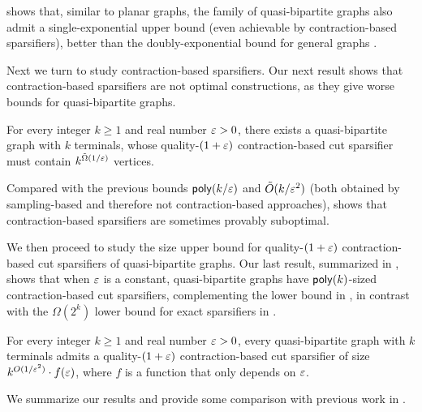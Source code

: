  shows that, similar to planar graphs, the family of quasi-bipartite graphs also admit a single-exponential upper bound (even achievable by contraction-based sparsifiers), better than the doubly-exponential bound for general graphs \cite{hagerup1998characterizing,khan2014mimicking,karpov2017exponential}.

Next we turn to study contraction-based sparsifiers.
Our next result shows that contraction-based sparsifiers are not optimal constructions, as they give worse bounds for quasi-bipartite graphs.

\begin{theorem}
\label{main: lower}
For every integer $k\ge 1$ and real number ${\varepsilon}>0$, there exists a quasi-bipartite graph with $k$ terminals, whose quality-$(1+{\varepsilon})$ contraction-based cut sparsifier must contain $k^{\tilde\Omega(1/{\varepsilon})}$ vertices.
\end{theorem}

Compared with the previous bounds $\mathsf{poly}(k/{\varepsilon})$ \cite{andoni2014towards} and $\tilde O(k/{\varepsilon}^2)$ \cite{jambulapati2023sparsifying} (both obtained by sampling-based and therefore not contraction-based approaches),  shows that contraction-based sparsifiers are sometimes provably suboptimal.

We then proceed to study the size upper bound for quality-$(1+{\varepsilon})$ contraction-based cut sparsifiers of quasi-bipartite graphs. Our last result, summarized in , shows that when ${\varepsilon}$ is a constant, quasi-bipartite graphs have $\mathsf{poly}(k)$-sized contraction-based cut sparsifiers, complementing the lower bound in , in contrast with the $\Omega(2^k)$ lower bound for exact sparsifiers in .

\begin{theorem}
\label{quasi_apx}
For every integer $k\ge 1$ and real number ${\varepsilon}>0$, every quasi-bipartite graph with $k$ terminals admits a quality-$(1+{\varepsilon})$ contraction-based cut sparsifier of size $k^{O(1/{\varepsilon}^2)}\cdot f({\varepsilon})$, where $f$ is a function that only depends on ${\varepsilon}$.
\end{theorem}

We summarize our results and provide some comparison with previous work in .

